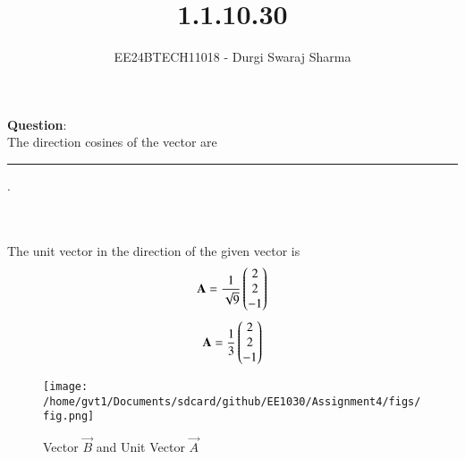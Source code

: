 \documentclass[journal]{IEEEtran}
\begin{document}

\vspace{3cm}

\title{1.1.10.30}
\author{EE24BTECH11018 - Durgi Swaraj Sharma}

{\let\newpage\relax\maketitle}

\renewcommand{\thefigure}{\theenumi}
\renewcommand{\thetable}{\theenumi}
\setlength{\intextsep}{10pt} %


\renewcommand{\thetable}{\theenumi}

 \textbf{Question}:\\
The direction cosines of the vector  are \rule{1cm}{0.2pt}. \\

\solution\\
\begin{table}[h!]    
      \centering
      
    \end{table}\\
The unit vector in the direction of the given vector is \\
\begin{align}
	\mathbf{A} = \frac{1}{\sqrt{9}} \begin{pmatrix}2 \\ 2 \\ -1\end{pmatrix} \label{eq1.1.10.30.1}
\end{align}
\begin{align}
	\mathbf{A} = \frac{1}{3} \begin{pmatrix}2 \\ 2 \\ -1\end{pmatrix} \label{eq1.1.10.30.2}
\end{align}

\begin{figure}[h]
        \centering
       \texttt{[image: /home/gvt1/Documents/sdcard/github/EE1030/Assignment4/figs/fig.png]}  
	\caption{Vector $\vec{B}$ and Unit Vector $\vec{A}$}
       \label{graph}
    \end{figure}
\end{document}
